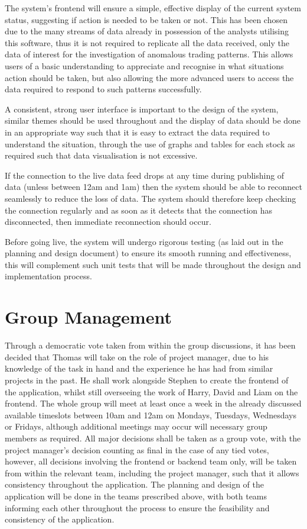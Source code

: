\documentclass[10pt, oneside, a4paper]{article}
\begin{document}
The system's frontend will ensure a simple, effective display of the current system status, suggesting if action
is needed to be taken or not. This has been chosen due to the many streams of data already in possession of the
analysts utilising this software, thus it is not required to replicate all the data received, only the data of
interest for the investigation of anomalous trading patterns. This allows users of a basic understanding to
appreciate and recognise in what situations action should be taken, but also allowing the more advanced users to
access the data required to respond to such patterns successfully.

A consistent, strong user interface is important to the design of the system, similar themes should be used
throughout and the display of data should be done in an appropriate way such that it is easy to extract the
data required to understand the situation, through the use of graphs and tables for each stock as required such
that data visualisation is not excessive.

If the connection to the live data feed drops at any time during publishing of data (unless between 12am and
1am) then the system should be able to reconnect seamlessly to reduce the loss of data. The system should
therefore keep checking the connection regularly and as soon as it detects that the connection has disconnected,
then immediate reconnection should occur.

Before going live, the system will undergo rigorous testing (as laid out in the planning and design document)
to ensure its smooth running and effectiveness, this will complement such unit tests that will be made throughout
the design and implementation process.

\section{Group Management}
Through a democratic vote taken from within the group discussions, it has been decided that Thomas will take on
the role of project manager, due to his knowledge of the task in hand and the experience he has had from similar
projects in the past. He shall work alongside Stephen to create the frontend of the application, whilst still
overseeing the work of Harry, David and Liam on the frontend. The whole group will meet at least once a week in
the already discussed available timeslots between 10am and 12am on Mondays, Tuesdays, Wednesdays or Fridays, although
additional meetings may occur will necessary group members as required. All major decisions shall be taken as a group
vote, with the project manager's decision counting as final in the case of any tied votes, however, all decisions
involving the frontend or backend team only, will be taken from within the relevant team, including the project manager,
such that it allows consistency throughout the application.
The planning and design of the application will be done in the teams prescribed above, with both teams informing
each other throughout the process to ensure the feasibility and consistency of the application.
\end{document}

